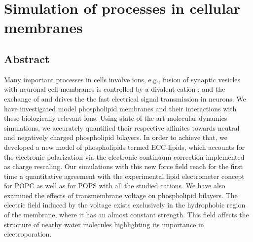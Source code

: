\documentclass[12pt,a4paper]{report}
\begin{document}
\chapter*{Simulation of processes in cellular membranes}

\section*{Abstract}

Many important processes in cells involve ions, e.g., 
fusion of synaptic vesicles with neuronal cell membranes 
is controlled by a divalent cation ;
and the exchange of  and 
drives the the fast electrical signal transmission in neurons. 
We have investigated model phospholipid membranes and their interactions 
with these biologically relevant ions. 
Using state-of-the-art molecular dynamics simulations,
we accurately quantified their respective affinites 
towards neutral and negatively charged phospholipid bilayers. 
In order to achieve that,
we developed a new model of phospholipids termed ECC-lipids,
which accounts for the electronic polarization
via the electronic continuum correction implemented as charge rescaling. 
Our simulations with this new force field 
reach for the first time a quantitative agreement 
with the experimental lipid electrometer concept 
for POPC as well as for POPS with all the studied cations. 
We have also examined the effects of transmembrane voltage on phospholipid bilayers. 
The electric field induced by the voltage 
exists exclusively in the hydrophobic region of the membrane,
where it has an almost constant strength. 
This field affects the structure of nearby water molecules 
highlighting its importance in electroporation. 
\end{document}
